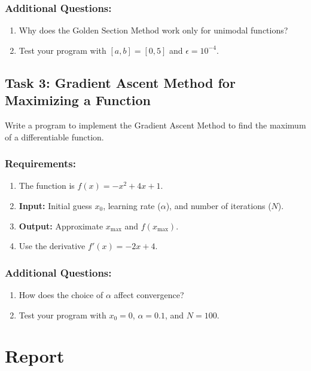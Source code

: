 \documentclass[12pt]{article}
\begin{document}
\subsubsection*{Additional Questions:}
\begin{enumerate}
    \item Why does the Golden Section Method work only for unimodal functions?
    \item Test your program with $[a, b] = [0, 5]$ and $\epsilon = 10^{-4}$.
\end{enumerate}

\subsection*{Task 3: Gradient Ascent Method for Maximizing a Function}
Write a program to implement the Gradient Ascent Method to find the maximum of a differentiable function.

\subsubsection*{Requirements:}
\begin{enumerate}
    \item The function is $f(x) = -x^2 + 4x + 1$.
    \item \textbf{Input:} Initial guess $x_0$, learning rate ($\alpha$), and number of iterations ($N$).
    \item \textbf{Output:} Approximate $x_{\text{max}}$ and $f(x_{\text{max}})$.
    \item Use the derivative $f'(x) = -2x + 4$.
\end{enumerate}

\subsubsection*{Additional Questions:}
\begin{enumerate}
    \item How does the choice of $\alpha$ affect convergence?
    \item Test your program with $x_0 = 0$, $\alpha = 0.1$, and $N = 100$.
\end{enumerate}

\section*{Report}
\end{document}
